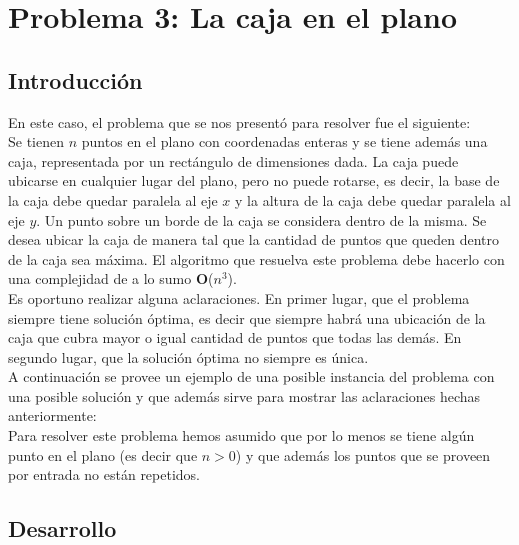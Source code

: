 \section{Problema 3: La caja en el plano}

\subsection{Introducci\'on}

\indent En este caso, el problema que se nos presentó para resolver fue el siguiente:\\
\indent Se tienen $n$ puntos en el plano con coordenadas enteras y se tiene adem\'as una caja, representada por un rect\'angulo de dimensiones dada. La caja puede ubicarse en cualquier lugar del plano, pero no puede rotarse, es decir, la base de la caja debe quedar paralela al eje $x$ y la altura de la caja debe quedar paralela al eje $y$. Un punto sobre un borde de la caja se considera dentro de la misma. Se desea ubicar la caja de manera tal que la cantidad de puntos que queden dentro de la caja sea m\'axima. El algoritmo que resuelva este problema debe hacerlo con una complejidad de a lo sumo \textbf{O}($n^{3}$).\\
\indent Es oportuno realizar alguna aclaraciones. En primer lugar, que el problema siempre tiene soluci\'on \'optima, es decir que siempre habr\'a una ubicaci\'on de la caja que cubra mayor o igual cantidad de puntos que todas las dem\'as. En segundo lugar, que la soluci\'on \'optima no siempre es \'unica. \\
\indent A continuaci\'on se provee un ejemplo de una posible instancia del problema con una posible soluci\'on y que adem\'as sirve para mostrar las aclaraciones hechas anteriormente:\\




\indent Para resolver este problema hemos asumido que por lo menos se tiene alg\'un punto en el plano (es decir que $n>0$) y que adem\'as los puntos que se proveen por entrada no est\'an repetidos.\\

\subsection{Desarrollo}


